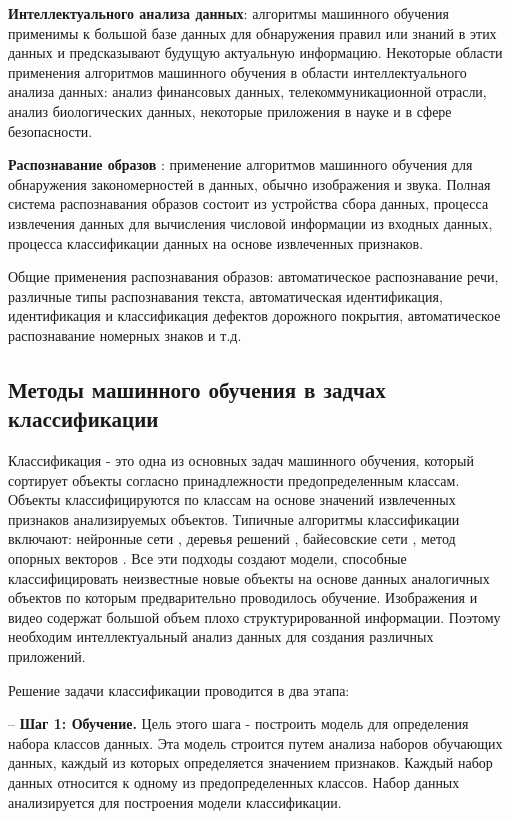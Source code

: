 \documentclass[a4paper,14pt]{extreport}
\begin{document}
\textbf{Интеллектуального анализа данных}\cite{h41, h42, h43}: алгоритмы машинного обучения применимы к большой базе данных для обнаружения правил или знаний в этих данных и предсказывают будущую актуальную информацию. Некоторые области применения алгоритмов машинного обучения в области интеллектуального анализа данных: анализ финансовых данных, телекоммуникационной отрасли, анализ биологических данных, некоторые приложения в науке и в сфере безопасности.

\textbf{Распознавание образов} \cite{h44, h45, h46, h47}: применение алгоритмов машинного обучения для обнаружения закономерностей в данных, обычно изображения и звука. Полная система распознавания образов состоит из устройства сбора данных, процесса извлечения данных для вычисления числовой информации из входных данных, процесса классификации данных на основе извлеченных признаков.

Общие применения распознавания образов: автоматическое распознавание речи, различные типы распознавания текста, автоматическая идентификация, идентификация и классификация дефектов дорожного покрытия, автоматическое распознавание номерных знаков и т.д.

\subsection{Методы машинного обучения в задчах классификации}
Классификация - это одна из основных задач машинного обучения, который сортирует объекты согласно принадлежности предопределенным классам. Объекты классифицируются по классам на основе значений извлеченных признаков анализируемых объектов. Типичные алгоритмы классификации включают: нейронные сети \cite{h48}, деревья решений \cite{h49, h50}, байесовские сети \cite{h51}, метод опорных векторов \cite{h52, h53}. Все эти подходы создают модели, способные классифицировать неизвестные новые объекты на основе данных аналогичных объектов по которым предварительно проводилось обучение. Изображения и видео содержат большой объем плохо структурированной информации. Поэтому необходим интеллектуальный анализ данных для создания различных приложений.

Решение задачи классификации проводится в два этапа:

-- \textbf{Шаг 1: Обучение.} Цель этого шага - построить модель для определения набора классов данных. Эта модель строится путем анализа наборов обучающих данных, каждый из которых определяется значением признаков. Каждый набор данных относится к одному из предопределенных классов. Набор данных анализируется для построения модели классификации.
\end{document}
